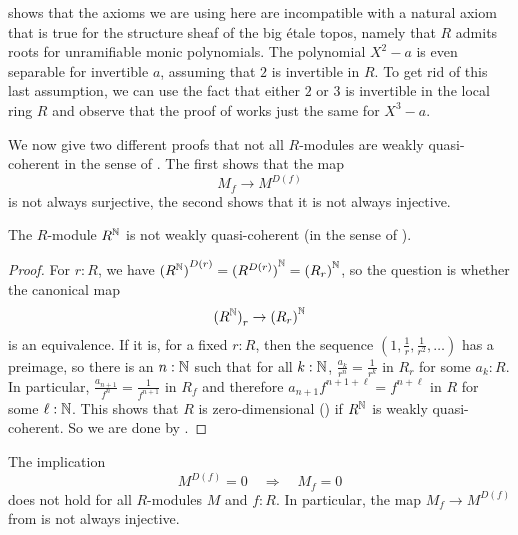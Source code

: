 \begin{remark}
   shows that
  the axioms we are using here
  are incompatible with a natural axiom that is true
  for the structure sheaf of the big étale topos,
  namely that $R$ admits roots for unramifiable monic polynomials.
  The polynomial $X^2 - a$ is even separable for invertible $a$,
  assuming that $2$ is invertible in $R$.
  To get rid of this last assumption,
  we can use the fact that either $2$ or $3$ is invertible in the local ring $R$
  and observe that the proof of 
  works just the same for $X^3 - a$.
\end{remark}

We now give two different proofs that not all $R$-modules are weakly quasi-coherent
in the sense of .
The first shows that the map
\[ M_f \to M^{D(f)} \]
is not always surjective,
the second shows that it is not always injective.

\begin{proposition}%
  \label{RN-non-wqc}
  The $R$-module $R^{\mathbb{N}}$ is not weakly quasi-coherent
  (in the sense of ).
\end{proposition}

\begin{proof}
  For $r : R$,
  we have ${(R^{\mathbb{N}})}^{D(r)} = {(R^{D(r)})}^{\mathbb{N}} = {(R_r)}^{\mathbb{N}}$,
  so the question is whether the canonical map
  \[ {(R^{\mathbb{N}})}_r \to {(R_r)}^{\mathbb{N}} \]
  is an equivalence.
  If it is,
  for a fixed $r : R$,
  then the sequence $(1, \frac{1}{r}, \frac{1}{r^2}, \dots)$
  has a preimage,
  so there is an $n : \mathbb{N}$ such that
  for all $k : \mathbb{N}$,
  $\frac{a_k}{r^n} = \frac{1}{r^k}$ in $R_r$
  for some $a_k : R$.
  In particular, $\frac{a_{n+1}}{f^n} = \frac{1}{f^{n+1}}$ in $R_f$
  and therefore $a_{n+1} f^{n+1+\ell} = f^{n+\ell}$ in $R$ for some $\ell : \mathbb{N}$.
  This shows that $R$ is zero-dimensional
  ()
  if $R^{\mathbb{N}}$ is weakly quasi-coherent.
  So we are done by .
\end{proof}

\begin{proposition}%
  \label{non-wqc-module-family}
  The implication
  \[ M^{D(f)} = 0 \quad\Rightarrow\quad M_f = 0 \]
  does not hold for all $R$-modules $M$ and $f : R$.
  In particular,
  the map $M_f \to M^{D(f)}$ from 
  is not always injective.
\end{proposition}


